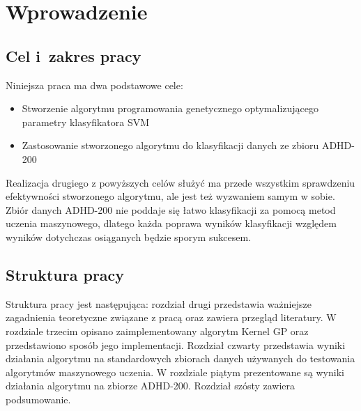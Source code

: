 \chapter{Wprowadzenie}


\section{Cel i~zakres pracy}
Niniejsza praca ma dwa podstawowe cele:
\begin{itemize}
\item Stworzenie algorytmu programowania genetycznego optymalizującego parametry klasyfikatora SVM
\item Zastosowanie stworzonego algorytmu do klasyfikacji danych ze zbioru ADHD-200
\end{itemize}
Realizacja drugiego z powyższych celów służyć ma przede wszystkim sprawdzeniu efektywności stworzonego algorytmu, ale jest też wyzwaniem samym w sobie. Zbiór danych ADHD-200 nie poddaje się łatwo klasyfikacji za pomocą metod uczenia maszynowego, dlatego każda poprawa wyników klasyfikacji względem wyników dotychczas osiąganych będzie sporym sukcesem.

\section{Struktura pracy}
Struktura pracy jest następująca: rozdział drugi przedstawia ważniejsze zagadnienia teoretyczne związane z pracą oraz zawiera przegląd literatury. W rozdziale trzecim opisano zaimplementowany algorytm Kernel GP oraz przedstawiono sposób jego implementacji. Rozdział czwarty przedstawia wyniki działania algorytmu na standardowych zbiorach danych używanych do testowania algorytmów maszynowego uczenia. W rozdziale piątym prezentowane są wyniki działania algorytmu na zbiorze ADHD-200. Rozdział szósty zawiera podsumowanie.


